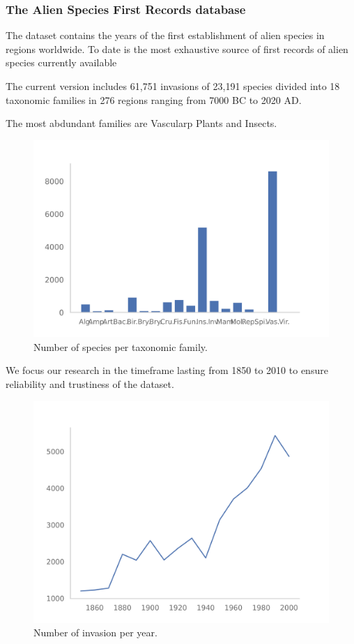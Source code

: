 \documentclass[
	11pt, %
]{beamer}
\begin{document}
\begin{frame}
	\frametitle{The Alien Species First Records database}
	
	The dataset contains the years of the first establishment of alien species in regions worldwide. To date is the most exhaustive source of first records of alien species currently available
	
	\bigskip
	
	The current version includes 61,751 invasions of 23,191 species divided into 18 taxonomic families in 276 regions ranging from 7000 BC to 2020 AD. 
\end{frame}

\begin{frame}
The most abdundant families are Vascularp Plants and Insects.

\begin{figure}
		\includegraphics[width=0.8\linewidth]{histogram_taxfam}
		\caption{Number of species per taxonomic family.}
	\end{figure}
\end{frame}

\begin{frame}
		
	We focus our research in the timeframe lasting from 1850 to 2010 to ensure reliability and trustiness of the dataset.

	
	\smallskip
		
	\begin{figure}
		\includegraphics[width=0.6\linewidth]{invasion_per_year}
		\caption{Number of invasion per year.}
	\end{figure}
	
	\smallskip	
\end{frame}
\end{document}
